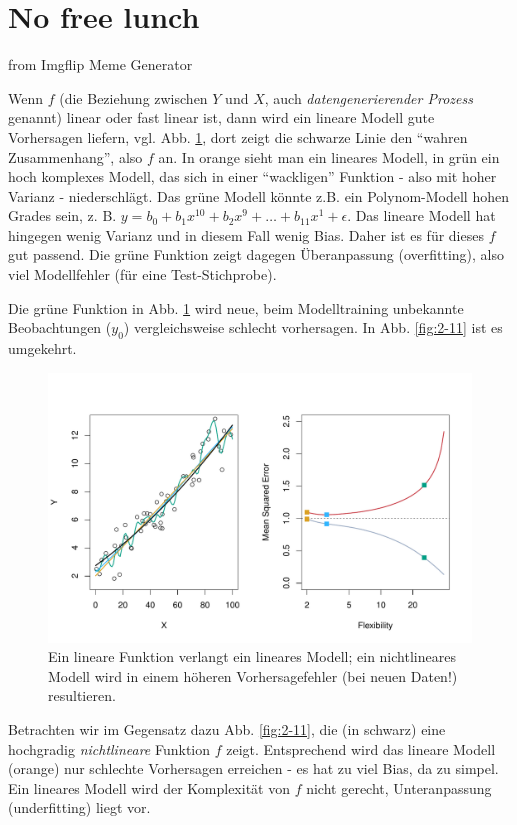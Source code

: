 \documentclass[
]{book}
\begin{document}
\hypertarget{no-free-lunch}{%
\section{No free lunch}\label{no-free-lunch}}

from Imgflip Meme Generator

Wenn \(f\) (die Beziehung zwischen \(Y\) und \(X\), auch \emph{datengenerierender Prozess} genannt) linear oder fast linear ist,
dann wird ein lineare Modell gute Vorhersagen liefern, vgl. Abb. \ref{fig:2-10}, dort zeigt die schwarze Linie den ``wahren Zusammenhang'', also \(f\) an. In orange sieht man ein lineares Modell, in grün ein hoch komplexes Modell,
das sich in einer ``wackligen'' Funktion - also mit hoher Varianz -
niederschlägt. Das grüne Modell könnte z.B. ein Polynom-Modell hohen Grades sein, z. B.
\(y = b_0 + b_1 x^{10} + b_2 x^9 + \ldots + b_11 x^1 + \epsilon\).
Das lineare Modell hat hingegen wenig Varianz und in diesem Fall wenig Bias.
Daher ist es für dieses \(f\) gut passend.
Die grüne Funktion zeigt dagegen Überanpassung (overfitting),
also viel Modellfehler (für eine Test-Stichprobe).

Die grüne Funktion in Abb. \ref{fig:2-10} wird neue, beim Modelltraining unbekannte Beobachtungen (\(y_0\)) vergleichsweise schlecht vorhersagen. In Abb. \ref{fig:2-11} ist es umgekehrt.

\begin{figure}[H]

{\centering \includegraphics[width=0.7\linewidth]{img/2-10} 

}

\caption{Ein lineare Funktion verlangt ein lineares Modell; ein nichtlineares Modell wird in einem höheren Vorhersagefehler (bei neuen Daten!) resultieren.}\label{fig:2-10}
\end{figure}

Betrachten wir im Gegensatz dazu Abb. \ref{fig:2-11}, die (in schwarz) eine hochgradig \emph{nichtlineare} Funktion \(f\) zeigt.
Entsprechend wird das lineare Modell (orange) nur schlechte Vorhersagen erreichen - es hat zu viel Bias, da zu simpel.
Ein lineares Modell wird der Komplexität von \(f\) nicht gerecht,
Unteranpassung (underfitting) liegt vor.
\end{document}
